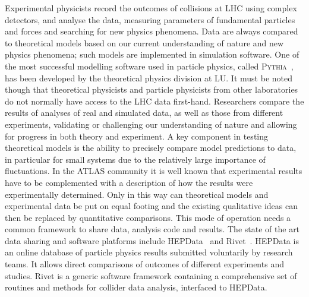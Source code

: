 \documentclass[a4paper,justified]{tufte-handout}
\begin{document}
Experimental physicists record the outcomes of collisions at LHC using complex
detectors, and analyse the data, measuring parameters of fundamental particles
and forces and searching for new physics phenomena. Data are always compared
to theoretical models based on our current understanding of nature and new
physics phenomena; such models are implemented in simulation software. One of
the most successful modelling software used in particle physics, called \textsc{Pythia}~\cite{Sjostrand:2006za}, has been developed by the theoretical physics division at LU. It must be noted though that theoretical physicists and particle physicists from other laboratories do not normally have access to the LHC data first-hand. 
Researchers compare the results of analyses of real and simulated data, as
well as those from different experiments, validating or challenging our
understanding of nature and allowing for progress in both theory and
experiment. A key component in testing theoretical models is the ability to
precisely compare model predictions to data, in particular for small systems
due to the relatively large importance of fluctuations. In the ATLAS community
it is well known that experimental results have to be complemented with a
description of how the results were experimentally determined. Only in this way can theoretical models
and experimental data be put on equal footing and the existing qualitative
ideas can then be replaced by quantitative comparisons. This mode of operation needs a common framework to share data, analysis code and results. The state of the art data sharing and software platforms include HEPData~\cite{Buckley:2010jn} and Rivet~\cite{Buckley:2010ar}. HEPData is an online database of particle physics results submitted voluntarily by research teams. It allows direct comparisons of outcomes of different experiments and studies. Rivet is a generic software framework containing a comprehensive set of routines and methods for collider data analysis, interfaced to HEPData.
\end{document}
